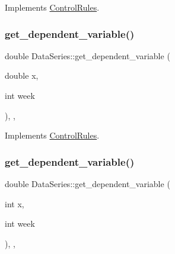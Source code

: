 Implements \mbox{\hyperlink{classControlRules_a56a42b40bf093237929a9c835dc9b772_a56a42b40bf093237929a9c835dc9b772}{Control\+Rules}}.

\mbox{\label{classDataSeries_a1242b9fdbdbb4e91a0e8b9e2383085d8_a1242b9fdbdbb4e91a0e8b9e2383085d8}} 
\subsubsection{\texorpdfstring{get\+\_\+dependent\+\_\+variable()}{get\_dependent\_variable()}\hspace{0.1cm}{\footnotesize\ttfamily [3/4]}}
{\footnotesize\ttfamily double Data\+Series\+::get\+\_\+dependent\+\_\+variable (\begin{DoxyParamCaption}\item[{double}]{x,  }\item[{int}]{week }\end{DoxyParamCaption})\hspace{0.3cm}{\ttfamily [override]}, {\ttfamily [private]}, {\ttfamily [virtual]}}



Implements \mbox{\hyperlink{classControlRules_a4c5a86844c3d6409bfa0ba2b058f82e7_a4c5a86844c3d6409bfa0ba2b058f82e7}{Control\+Rules}}.

\mbox{\label{classDataSeries_a16a0aab69c764944dbb4a55b7432f37b_a16a0aab69c764944dbb4a55b7432f37b}} 
\subsubsection{\texorpdfstring{get\+\_\+dependent\+\_\+variable()}{get\_dependent\_variable()}\hspace{0.1cm}{\footnotesize\ttfamily [4/4]}}
{\footnotesize\ttfamily double Data\+Series\+::get\+\_\+dependent\+\_\+variable (\begin{DoxyParamCaption}\item[{int}]{x,  }\item[{int}]{week }\end{DoxyParamCaption})\hspace{0.3cm}{\ttfamily [override]}, {\ttfamily [private]}, {\ttfamily [virtual]}}



